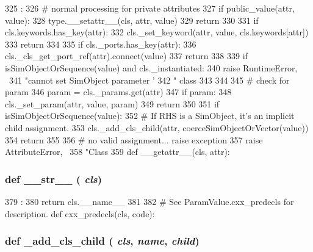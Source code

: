 \begin{DoxyCode}
325                                      :
326         # normal processing for private attributes
327         if public_value(attr, value):
328             type.__setattr__(cls, attr, value)
329             return
330 
331         if cls.keywords.has_key(attr):
332             cls._set_keyword(attr, value, cls.keywords[attr])
333             return
334 
335         if cls._ports.has_key(attr):
336             cls._cls_get_port_ref(attr).connect(value)
337             return
338 
339         if isSimObjectOrSequence(value) and cls._instantiated:
340             raise RuntimeError, \
341                   "cannot set SimObject parameter '%
342                   "    class %
343                   %
344 
345         # check for param
346         param = cls._params.get(attr)
347         if param:
348             cls._set_param(attr, value, param)
349             return
350 
351         if isSimObjectOrSequence(value):
352             # If RHS is a SimObject, it's an implicit child assignment.
353             cls._add_cls_child(attr, coerceSimObjectOrVector(value))
354             return
355 
356         # no valid assignment... raise exception
357         raise AttributeError, \
358               "Class %
359 
    def __getattr__(cls, attr):
\end{DoxyCode}
\hypertarget{classm5_1_1SimObject_1_1MetaSimObject_aa7a4b9bc0941308e362738503137460e}{
\subsubsection[{\_\-\_\-str\_\-\_\-}]{\setlength{\rightskip}{0pt plus 5cm}def \_\-\_\-str\_\-\_\- ( {\em cls})}}
\label{classm5_1_1SimObject_1_1MetaSimObject_aa7a4b9bc0941308e362738503137460e}



\begin{DoxyCode}
379                     :
380         return cls.__name__
381 
382     # See ParamValue.cxx_predecls for description.
    def cxx_predecls(cls, code):
\end{DoxyCode}
\hypertarget{classm5_1_1SimObject_1_1MetaSimObject_a0d41fdb3a505fbc4c37db240d67c1140}{
\subsubsection[{\_\-add\_\-cls\_\-child}]{\setlength{\rightskip}{0pt plus 5cm}def \_\-add\_\-cls\_\-child ( {\em cls}, \/   {\em name}, \/   {\em child})}}
\label{classm5_1_1SimObject_1_1MetaSimObject_a0d41fdb3a505fbc4c37db240d67c1140}



